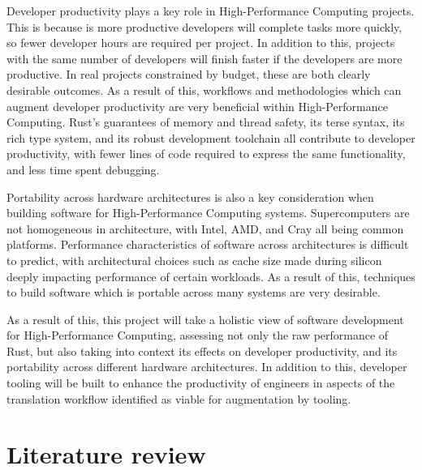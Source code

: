 Developer productivity plays a key role in High-Performance Computing projects. This is because is more productive developers will complete tasks more quickly, so fewer developer hours are required per project. In addition to this, projects with the same number of developers will finish faster if the developers are more productive. In real projects constrained by budget, these are both clearly desirable outcomes. As a result of this, workflows and methodologies which can augment developer productivity are very beneficial within High-Performance Computing. Rust's guarantees of memory and thread safety, its terse syntax, its rich type system, and its robust development toolchain all contribute to developer productivity, with fewer lines of code required to express the same functionality, and less time spent debugging.

Portability across hardware architectures is also a key consideration when building software for High-Performance Computing systems. Supercomputers are not homogeneous in architecture, with Intel, AMD, and Cray all being common platforms. Performance characteristics of software across architectures is difficult to predict, with architectural choices such as cache size made during silicon deeply impacting performance of certain workloads. As a result of this, techniques to build software which is portable across many systems are very desirable.

As a result of this, this project will take a holistic view of software development for High-Performance Computing, assessing not only the raw performance of Rust, but also taking into context its effects on developer productivity, and its portability across different hardware architectures. In addition to this, developer tooling will be built to enhance the productivity of engineers in aspects of the translation workflow identified as viable for augmentation by tooling.


\section{Literature review} %
\label{sec:literature-review}

